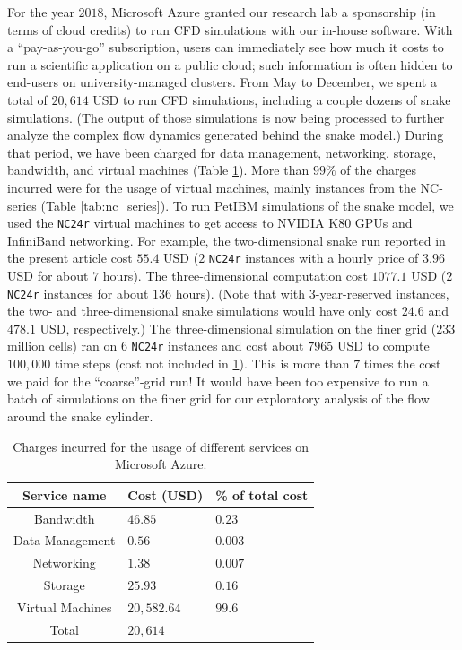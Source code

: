 \documentclass[10pt,journal,compsoc]{IEEEtran}
\begin{document}
For the year $2018$, Microsoft Azure granted our research lab a sponsorship (in terms of cloud credits) to run CFD simulations with our in-house software.
With a ``pay-as-you-go'' subscription, users can immediately see how much it costs to run a scientific application on a public cloud; such information is often hidden to end-users on university-managed clusters.
From May to December, we spent a total of $20,614$ USD to run CFD simulations, including a couple dozens of snake simulations.
(The output of those simulations is now being processed to further analyze the complex flow dynamics generated behind the snake model.)
During that period, we have been charged for data management, networking, storage, bandwidth, and virtual machines (Table \ref{tab:azure_charges}).
More than $99\%$ of the charges incurred were for the usage of virtual machines, mainly instances from the NC-series (Table \ref{tab:nc_series}).
To run PetIBM simulations of the snake model, we used the \texttt{NC24r} virtual machines to get access to NVIDIA K80 GPUs and InfiniBand networking.
For example, the two-dimensional snake run reported in the present article cost $55.4$ USD ($2$ \texttt{NC24r} instances with a hourly price of $3.96$ USD for about $7$ hours).
The three-dimensional computation cost $1077.1$ USD ($2$ \texttt{NC24r} instances for about $136$ hours).
(Note that with 3-year-reserved instances, the two- and three-dimensional snake simulations would have only cost $24.6$ and $478.1$ USD, respectively.)
The three-dimensional simulation on the finer grid ($233$ million cells) ran on $6$ \texttt{NC24r} instances and cost about $7965$ USD to compute $100,000$ time steps (cost not included in \ref{tab:azure_charges}).
This is more than $7$ times the cost we paid for the ``coarse''-grid run!
It would have been too expensive to run a batch of simulations on the finer grid for our exploratory analysis of the flow around the snake cylinder.

\begin{table}
    \renewcommand{\arraystretch}{1.5}
    \caption{Charges incurred for the usage of different services on Microsoft Azure.}
    \label{tab:azure_charges}
    \centering
    \begin{tabular}{cll}
        Service name & Cost (USD) & \% of total cost \\
        \hline
        Bandwidth & $46.85$ & $0.23$ \\
        Data Management & $0.56$ & $0.003$ \\
        Networking & $1.38$ & $0.007$ \\
        Storage & $25.93$ & $0.16$ \\
        Virtual Machines & $20,582.64$& $99.6$ \\
        \hline
        Total & $20,614$ & \\
        \hline
    \end{tabular}
\end{table}
\end{document}
